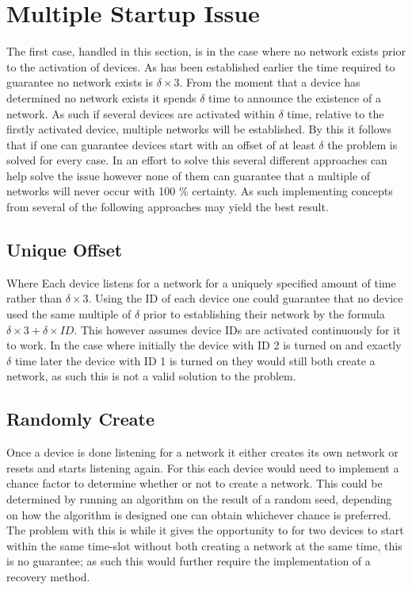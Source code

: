 \section{Multiple Startup Issue}\label{sec:MSI-CCRC}
The first case, handled in this section, is in the case where no network exists prior to the activation of devices.
As has been established earlier the time required to guarantee no network exists is $\delta \times 3$.
From the moment that a device has determined no network exists it spends $\delta$ time to announce the existence of a network.
As such if several devices are activated within $\delta$ time, relative to the firstly activated device, multiple networks will be established.
By this it follows that if one can guarantee devices start with an offset of at least $\delta$ the problem is solved for every case.
In an effort to solve this several different approaches can help solve the issue however none of them can guarantee that a multiple of networks will never occur with 100 \% certainty. 
As such implementing concepts from several of the following approaches may yield the best result.

\subsection{Unique Offset}
Where Each device listens for a network for a uniquely specified amount of time rather than $\delta \times 3$.
Using the ID of each device one could guarantee that no device used the same multiple of $\delta$ prior to establishing their network by the formula $\delta \times 3 + \delta \times ID$.
This however assumes device IDs are activated continuously for it to work.
In the case where initially the device with ID 2 is turned on and exactly $\delta$ time later the device with ID 1 is turned on they would still both create a network, as such this is not a valid solution to the problem.

\subsection{Randomly Create}\label{RCreate}
Once a device is done listening for a network it either creates its own network or resets and starts listening again.
For this each device would need to implement a chance factor to determine whether or not to create a network.
This could be determined by running an algorithm on the result of a random seed, depending on how the algorithm is designed one can obtain whichever chance is preferred.
The problem with this is while it gives the opportunity to for two devices to start within the same time-slot without both creating a network at the same time, this is no guarantee; as such this would further require the implementation of a recovery method.

